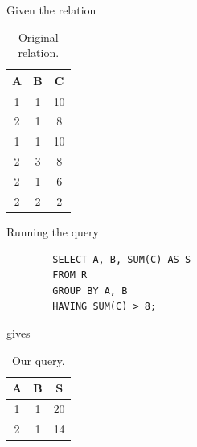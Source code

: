 \documentclass{article}
\begin{document}
    \begin{example}
      Given the relation 

      \begin{table}[H]
        \centering
        \begin{tabular}{|c|c|c|}
          \hline
          \textbf{A} & \textbf{B} & \textbf{C} \\
          \hline
          1 & 1 & 10 \\ 
          2 & 1 & 8 \\ 
          1 & 1 & 10 \\ 
          2 & 3 & 8 \\ 
          2 & 1 & 6 \\ 
          2 & 2 & 2 \\ 
          \hline
        \end{tabular}
        \caption{Original relation. }
        \label{tab:groupby2}
      \end{table}
    
      Running the query 
      \begin{lstlisting}
        SELECT A, B, SUM(C) AS S 
        FROM R 
        GROUP BY A, B 
        HAVING SUM(C) > 8; 
      \end{lstlisting}
      gives 
      
      \begin{table}[H]
        \centering
        \begin{tabular}{|c|c|c|}
          \hline
          \textbf{A} & \textbf{B} & \textbf{S} \\
          \hline
          1 & 1 & 20 \\ 
          2 & 1 & 14 \\ 
          \hline
        \end{tabular}
        \caption{Our query. }
        \label{tab:groupby2_output}
      \end{table}
    \end{example}
\end{document}

